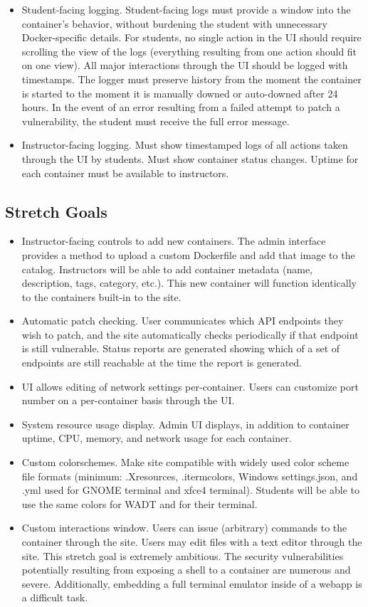 \documentclass[12pt]{article}
\begin{document}
\begin{itemize}
	\item Student-facing logging. Student-facing logs must provide a window into the container's behavior, without burdening the student with unnecessary Docker-specific details. For students, no single action in the UI should require scrolling the view of the logs (everything resulting from one action should fit on one view). All major interactions through the UI should be logged with timestamps. The logger must preserve history from the moment the container is started to the moment it is manually downed or auto-downed after 24 hours. In the event of an error resulting from a failed attempt to patch a vulnerability, the student must receive the full error message.
	\item Instructor-facing logging. Must show timestamped logs of all actions taken through the UI by students. Must show container status changes. Uptime for each container must be available to instructors.
\end{itemize}

\subsection{Stretch Goals}
\begin{itemize}
	\item Instructor-facing controls to add new containers. The admin interface provides a method to upload a custom Dockerfile and add that image to the catalog. Instructors will be able to add container metadata (name, description, tags, category, etc.). This new container will function identically to the containers built-in to the site.
	\item Automatic patch checking. User communicates which API endpoints they wish to patch, and the site automatically checks periodically if that endpoint is still vulnerable. Status reports are generated showing which of a set of endpoints are still reachable at the time the report is generated.
	\item UI allows editing of network settings per-container. Users can customize port number on a per-container basis through the UI.
	\item System resource usage display. Admin UI displays, in addition to container uptime, CPU, memory, and network usage for each container.
	\item Custom colorschemes.
	      Make site compatible with widely used color scheme file formats (minimum: .Xresources, .itermcolors, Windows settings.json, and .yml used for GNOME terminal and xfce4 terminal). Students will be able to use the same colors for WADT and for their terminal.
	\item Custom interactions window. Users can issue (arbitrary) commands to the container through the site. Users may edit files with a text editor through the site. This stretch goal is extremely ambitious. The security vulnerabilities potentially resulting from exposing a shell to a container are numerous and severe. Additionally, embedding a full terminal emulator inside of a webapp is a difficult task.
\end{itemize}
\end{document}
